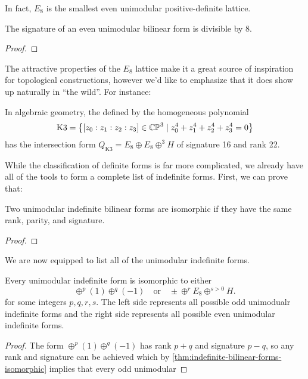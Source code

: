 In fact, $E_8$ is the smallest even unimodular positive-definite lattice.
\begin{theorem}
	The signature of an even unimodular bilinear form is divisible by $8$.
\end{theorem}
\begin{proof}
\end{proof}

The attractive properties of the $E_8$ lattice make it a great source of inspiration for topological constructions, however we'd like to emphasize that it does show up naturally in ``the wild''. For instance:

\begin{example}
	In algebraic geometry, the  defined by the homogeneous polynomial
	\[
		\textrm{K3} = \left\{ [z_0 : z_1 : z_2 : z_3]\in \mathbb{CP}^3 \mid z_0^4 + z_1^4+z_2^4 + z_3^4=0\right\}
	\]
	has the intersection form $Q_{\textrm{K3}} = E_8\oplus E_8 \oplus^3 H$ of signature 16 and rank 22.
\end{example}

While the classification of definite forms is far more complicated, we already have all of the tools to form a complete list of indefinite forms. First, we can prove that:

\begin{theorem}\label{thm:indefinite-bilinear-forms-isomorphic}
	Two unimodular indefinite bilinear forms are isomorphic if they have the same rank, parity, and signature.
\end{theorem}
\begin{proof}
\end{proof}

We are now equipped to list all of the unimodular indefinite forms.
\begin{proposition}
	Every unimodular indefinite form is isomorphic to either
	\[
		\oplus^p (1)\oplus^q (-1)
		\quad\textrm{or}\quad
		\pm \oplus^r E_8 \oplus^{s>0} H.
	\]
	for some integers $p,q,r,s$. The left side represents all possible odd unimodualr indefinite forms and the right side represents all possible even unimodular indefinite forms.
\end{proposition}
\begin{proof}
	The form $\oplus^p (1)\oplus^q(-1)$ has rank $p+q$ and signature $p-q$, so any rank and signature can be achieved which by \cref{thm:indefinite-bilinear-forms-isomorphic} implies that every odd unimodular 
\end{proof}

